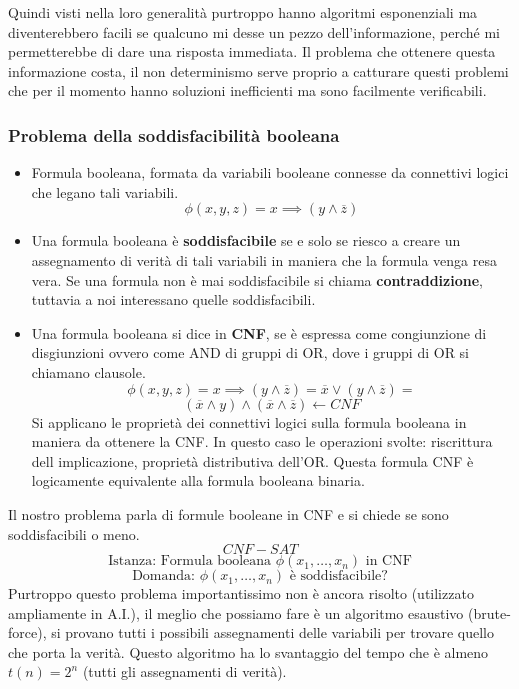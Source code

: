 \documentclass{article}
\begin{document}
Quindi visti nella loro generalità purtroppo hanno algoritmi esponenziali ma diventerebbero facili se
qualcuno mi desse un pezzo dell'informazione, perché mi permetterebbe di dare una risposta immediata.
Il problema che ottenere questa informazione costa, il non determinismo serve proprio a catturare questi
problemi che per il momento hanno soluzioni inefficienti ma sono facilmente verificabili.

\subsubsection{Problema della soddisfacibilità booleana}
\begin{itemize}
    \item Formula booleana, formata da variabili booleane connesse da connettivi logici che legano
    tali variabili.
    $$\phi(x,y,z)=x\implies(y\land \overline{z})$$
    \item Una formula booleana è \textbf{soddisfacibile} se e solo se riesco a creare un assegnamento
    di verità di tali variabili in maniera che la formula venga resa vera. Se una formula non è
    mai soddisfacibile si chiama \textbf{contraddizione}, tuttavia a noi interessano quelle
    soddisfacibili.
    \item Una formula booleana si dice in \textbf{CNF}, se è espressa come congiunzione di disgiunzioni
    ovvero come AND di gruppi di OR, dove i gruppi di OR si chiamano clausole.
    $$\phi(x,y,z)=x\implies(y\land\overline{z})=\overline{x}\lor (y\land\overline{z})=$$
    $$(\overline{x}\land y)\land(\overline{x}\land\overline{z})\leftarrow CNF$$
    Si applicano le proprietà dei connettivi logici sulla formula booleana in maniera da ottenere
    la CNF. In questo caso le operazioni svolte: riscrittura dell implicazione, proprietà distributiva
    dell'OR. Questa formula CNF è logicamente equivalente alla formula booleana binaria.
\end{itemize}
Il nostro problema parla di formule booleane in CNF e si chiede se sono soddisfacibili o meno.
$$CNF-SAT$$
$$\text{Istanza: Formula booleana }\phi (x_1,\dots,x_n)\text{ in CNF}$$
$$\text{Domanda: }\phi (x_1,\dots,x_n)\text{ è soddisfacibile?}$$
Purtroppo questo problema importantissimo non è ancora risolto (utilizzato ampliamente in A.I.),
il meglio che possiamo fare è un algoritmo esaustivo (brute-force), si provano tutti i possibili
assegnamenti delle variabili per trovare quello che porta la verità. Questo algoritmo ha lo svantaggio
del tempo che è almeno $t(n)=2^n$ (tutti gli assegnamenti di verità).
\end{document}
